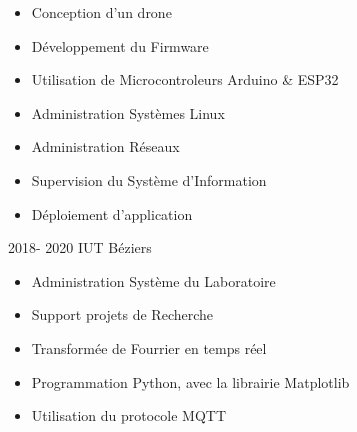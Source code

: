 \documentclass[10pt,a4paper,ragged2e]{altacv}
\begin{document}
 

\begin{fullwidth}
\makecvheader
\end{fullwidth}

\begin{itemize}
\item Conception d'un drone
\item Développement du Firmware 
\item Utilisation de Microcontroleurs Arduino \& ESP32 
\end{itemize}

\divider

\begin{itemize}
\item Administration Systèmes Linux
\item Administration Réseaux
\item Supervision du Système d'Information
\item Déploiement d'application 
\end{itemize}
 { 2018- 2020 }{IUT Béziers}
\begin{itemize}
    \item  Administration Système du Laboratoire
    \item Support projets de Recherche
\end{itemize}

\divider

\begin{itemize}
\item Transformée de Fourrier en temps réel
\item Programmation Python, avec la librairie Matplotlib 
\item Utilisation du protocole MQTT
\end{itemize}
\end{document}
